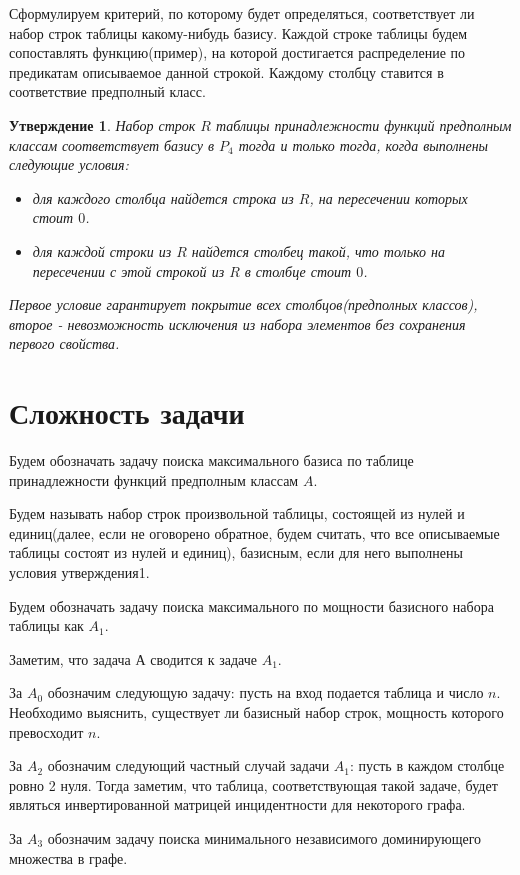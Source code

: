 \documentclass[a4paper,14pt]{extreport}
\newtheorem{utv}{Утверждение}
\begin{document}
Сформулируем критерий, по которому будет определяться, соответствует ли набор строк таблицы какому-нибудь базису.
Каждой строке таблицы будем сопоставлять функцию(пример), на которой достигается распределение по предикатам описываемое данной строкой. Каждому столбцу ставится в соответствие предполный класс.  
\begin{utv}
Набор строк $R$ таблицы принадлежности функций предполным классам соответствует базису в $P_4$ тогда и только тогда, когда выполнены следующие условия:
\begin{itemize}
\item для каждого столбца найдется строка из $R$, на пересечении которых стоит $0$.    
\item для каждой строки из $R$ найдется столбец такой, что только на пересечении с этой строкой из $R$ в столбце стоит $0$.   
\end{itemize}
Первое условие гарантирует покрытие всех столбцов(предполных классов), второе - невозможность исключения из набора элементов без сохранения первого свойства. 
\end{utv}

\section{Сложность задачи}
Будем обозначать задачу поиска максимального базиса по таблице принадлежности функций предполным классам $A$.

Будем называть набор строк произвольной таблицы, состоящей из нулей и единиц(далее, если не оговорено обратное, будем считать, что все описываемые таблицы состоят из нулей и единиц), базисным, если для него выполнены условия утверждения1.

Будем обозначать задачу поиска максимального по мощности базисного набора таблицы как $A_1$.

Заметим, что задача А сводится к задаче $A_1$.

За $A_0$ обозначим следующую задачу: пусть на вход подается таблица и число $n$. Необходимо выяснить, существует ли базисный набор строк, мощность которого превосходит $n$.

За $A_2$ обозначим следующий частный случай задачи $A_1$: пусть в каждом столбце ровно 2 нуля. Тогда заметим, что таблица, соответствующая такой задаче, будет являться инвертированной матрицей инцидентности для некоторого графа.

За $A_3$ обозначим задачу поиска минимального независимого доминирующего множества в графе.
\end{document}

